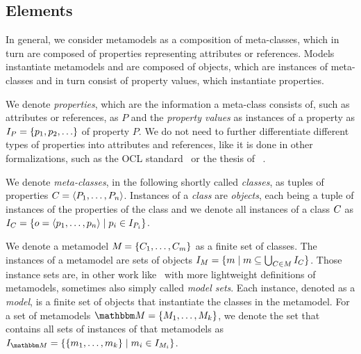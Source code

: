 \subsection{Elements}

In general, we consider metamodels as a composition of meta-classes, which in turn are composed of properties representing attributes or references.
Models instantiate metamodels and are composed of objects, which are instances of meta-classes and in turn consist of property values, which instantiate properties.

We denote \emph{properties}, which are the information a meta-class consists of, such as attributes or references, as $P$ and the \emph{property values} as instances of a property as $\metamodelinstances{P} = \setted{p_1, p_2, \dots}$ of property $P$. 
We do not need to further differentiate different types of properties into attributes and references, like it is done in other formalizations, such as the OCL standard~\cite[A.1]{ocl} or the thesis of \citeauthor{kramer2017a}~\cite[2.3.2]{kramer2017a}.

We denote \emph{meta-classes}, in the following shortly called \emph{classes}, as tuples of properties $C_{} = \langle P_1, \dots, P_n \rangle$. 
Instances of a \emph{class} are \emph{objects}, each being a tuple of instances of the properties of the class and we denote all instances of a class $C_{}$ as $I_{C} = \{ o = \langle p_1, \dots, p_n \rangle \mid p_i \in I_{P_i} \}$.

We denote a metamodel $M_{} = \{ C_{1}, \dots, C_{m} \}$ as a finite set of classes.
The instances of a metamodel are sets of objects $I_{M} = \{ m \mid m \subseteq \bigcup_{C_{} \in M_{}} I_{C} \}$.
Those instance sets are, in other work like~\cite{stevens2020BidirectionalTransformationLarge-SoSym} with more lightweight definitions of metamodels, sometimes also simply called \emph{model sets}.
Each instance, denoted as a \emph{model}, is a finite set of objects that instantiate the classes in the metamodel.
For a set of metamodels $\metamodelset{M} = \setted{\metamodel{M}{1}, \dots, \metamodel{M}{k}}$, we denote the set that contains all sets of instances of that metamodels as $\metamodelinstances{\metamodelset{M}} = \setted{ \setted{\model{m}{1}, \dots, \model{m}{k}} \mid \model{m}{i} \in \metamodelinstances{\metamodel{M}{i}}}$.


